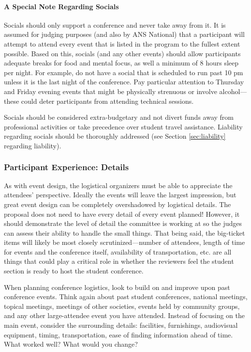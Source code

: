 \documentclass[12pt]{article}
\begin{document}
\paragraph{A Special Note Regarding Socials}
Socials should only support a conference and never take away from it. It is assumed for
judging purposes (and also by ANS National) that a participant will attempt to attend every
event that is listed in the program to the fullest extent possible. Based on this, socials (and any
other events) should allow participants adequate breaks for food and mental focus, as
well a minimum of 8 hours sleep per night. For example, do not have a social that is
scheduled to run past 10 pm unless it is the last night of the conference. Pay particular
attention to Thursday and Friday evening events that might be physically strenuous or
involve alcohol---these could deter participants from attending technical sessions.

Socials should be considered extra-budgetary and not divert funds away from
professional activities or take precedence over student travel assistance. Liability regarding socials should be thoroughly addressed (see Section \ref{sec:liability} regarding liability).

\subsubsection{Participant Experience: Details}
As with event design, the logistical organizers must be able to appreciate the attendees’
perspective. Ideally the events will leave the largest impression, but great event design
can be completely overshadowed by logistical details. The proposal does not need to
have every detail of every event planned! However, it should demonstrate the level of
detail the committee is working at so the judges can assess their ability to handle the small things. That being said, the big-ticket items will likely be most closely scrutinized---number of attendees, length of time for events and the conference itself, availability of transportation, etc. are all things that could play a critical role in whether the reviewers feel the student section is ready to host the student conference.

When planning conference logistics, look to build on and improve upon past conference
events. Think again about past student conferences, national meetings, topical meetings,
meetings of other societies, events held by community groups, and any other large-attendee event you have attended. Instead of focusing on the main event, consider the
surrounding details: facilities, furnishings, audiovisual equipment, timing, transportation,
ease of finding information ahead of time. What worked well? What would you change?
\end{document}
